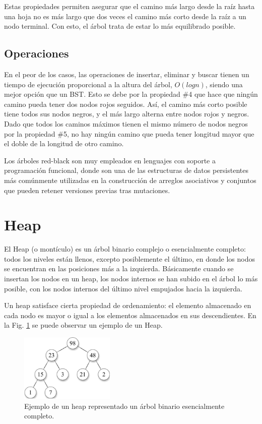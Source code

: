 Estas propiedades permiten asegurar que el camino más largo desde la raíz hasta una hoja no es más largo que dos veces el camino más corto desde la raíz a un nodo terminal. Con esto, el árbol trata de estar lo más equilibrado posible.

\subsection{Operaciones}

En el peor de los casos, las operaciones de insertar, eliminar y buscar tienen un tiempo de ejecución proporcional a la altura del árbol, $O(logn)$, siendo una mejor opción que un BST. Esto se debe por la propiedad \#4 que hace que ningún camino pueda tener dos nodos rojos seguidos. Así, el camino más corto posible tiene todos sus nodos negros, y el más largo alterna entre nodos rojos y negros. Dado que todos los caminos máximos tienen el mismo número de nodos negros por la propiedad \#5, no hay ningún camino que pueda tener longitud mayor que el doble de la longitud de otro camino.

Los árboles red-black son muy empleados en lenguajes con soporte a programación funcional, donde son una de las estructuras de datos persistentes más comúnmente utilizadas en la construcción de arreglos asociativos y conjuntos que pueden retener versiones previas tras mutaciones. 

\section{Heap}

El Heap (o montículo) es un árbol binario complejo o esencialmente completo: todos los niveles están llenos, excepto posiblemente el último, en donde los nodos se encuentran en las posiciones más a la izquierda. Básicamente cuando se insertan los nodos en un heap, los nodos internos se han subido en el árbol lo más posible, con los nodos internos del último nivel empujados hacia la izquierda.

Un heap satisface cierta propiedad de ordenamiento: el elemento almacenado en cada nodo es mayor o igual a los elementos almacenados en sus descendientes. En la Fig. \ref{fig:Heap1} se puede observar un ejemplo de un Heap.

\begin{figure}[htpb!]
  \begin{center}
    \includegraphics[width=0.4\textwidth]{images/heap.eps}
  \end{center}
  \caption{Ejemplo de un heap representado un árbol binario esencialmente completo.}
  \label{fig:Heap1}
\end{figure}

